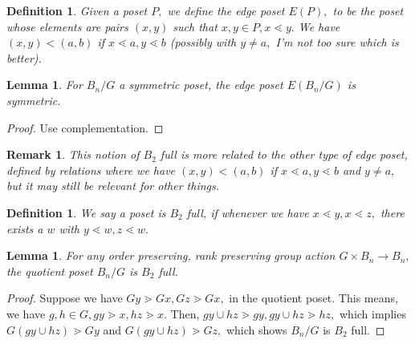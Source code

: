 \documentclass{amsart}
\newtheorem{lem}[subsubsection]{Lemma}
\newtheorem{defn}[subsubsection]{Definition}
\newtheorem{rem}[subsubsection]{Remark}
\begin{document}
\begin{defn}
Given a poset $P,$ we define the edge poset $E(P),$ to be the poset whose elements are pairs $(x,y)$ such that $x,y \in P, x \lessdot y.$ We have $(x,y) < (a,b)$ if $x \lessdot a, y\lessdot b$ (possibly with $y \neq a,$ I'm not too sure which is better).
\end{defn}

\begin{lem}
\label{symmetric_edge_quotients}
For $B_n/G$ a symmetric poset, the edge poset $E(B_n/G)$ is symmetric.
\end{lem}
\begin{proof}
Use complementation.
\end{proof}


\begin{rem}
This notion of $B_2$ full is more related to the other type of edge poset, defined by relations where we have $(x,y) < (a,b)$ if $x \lessdot a, y\lessdot b$ and $y \neq a,$ but it may still be relevant for other things.
\end{rem}


\begin{defn}
We say a poset is $B_2$ full, if whenever we have $x \lessdot y, x\lessdot z,$ there exists a $w$ with $y \lessdot w, z\lessdot w.$
\end{defn}

\begin{lem}
\label{quotients_B2_full}
For any order preserving, rank preserving group action $G \times B_n \rightarrow B_n,$ the quotient poset $B_n/G$ is $B_2$ full.
\end{lem}
\begin{proof}
Suppose we have $Gy\gtrdot Gx,Gz \gtrdot Gx,$ in the quotient poset. This means, we have $g,h \in G,gy \gtrdot x,hz \gtrdot x.$ Then, $gy \cup hz \gtrdot gy,gy\cup hz \gtrdot hz,$ which implies $G(gy \cup hz) \gtrdot Gy$ and  $G(gy \cup hz) \gtrdot Gz,$ which shows $B_n/G$ is $B_2$ full.
\end{proof}
\end{document}
